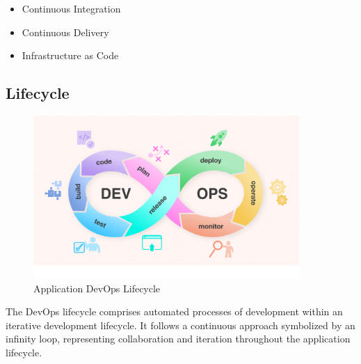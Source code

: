 \begin{itemize}
  \item Continuous Integration
  \item Continuous Delivery
  \item Infrastructure as Code
\end{itemize}


\subsection{Lifecycle}
\begin{figure}[H]
  \centering
  \includegraphics[width=0.9\textwidth]{src/assets/chapters/devopslifecycle.png}
  \caption{Application DevOps Lifecycle}
  \label{fig:application-devops-lifecycle}
\end{figure}

The DevOps lifecycle comprises automated processes of development within an iterative development lifecycle. It follows a continuous approach symbolized by an infinity loop, representing collaboration and iteration throughout the application lifecycle.

